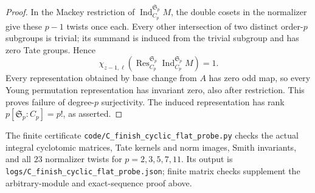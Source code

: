 \begin{proof}
In the Mackey restriction of
$\operatorname{Ind}_{C_p}^{\mathfrak S_p}M$, the double cosets in
the normalizer give these $p-1$ twists once each. Every other
intersection of two distinct order-$p$ subgroups is trivial;
its summand is induced from the trivial subgroup and has zero
Tate groups. Hence
\[
 \chi_{z-1,\ell}\!\left(
  \operatorname{Res}_{C_p}^{\mathfrak S_p}
  \operatorname{Ind}_{C_p}^{\mathfrak S_p}M\right)=1.
\]
Every representation obtained by base change from $A$ has zero
odd map, so every Young permutation representation has invariant
zero, also after restriction. This proves failure of degree-$p$
surjectivity. The induced representation has rank
$p[\mathfrak S_p:C_p]=p!$, as asserted.
\end{proof}

The finite certificate \texttt{code/C\_finish\_cyclic\_flat\_probe.py} checks the actual integral cyclotomic matrices, Tate kernels and norm images, Smith invariants, and all $23$ normalizer twists for $p=2,3,5,7,11$. Its output is \texttt{logs/C\_finish\_cyclic\_flat\_probe.json}; finite matrix checks supplement the arbitrary-module and exact-sequence proof above.
